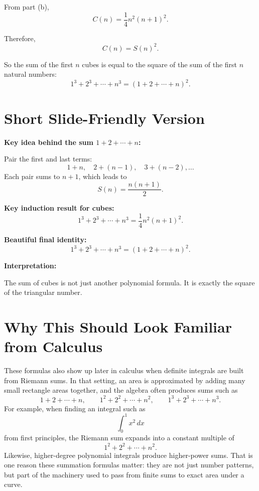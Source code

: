 \documentclass[12pt]{article}
\begin{document}
From part (b),
\[
C(n)=\frac{1}{4}n^2(n+1)^2.
\]

Therefore,
\[
C(n)=S(n)^2.
\]

So the sum of the first \(n\) cubes is equal to the square of the sum of the first \(n\) natural numbers:
\[
1^3+2^3+\cdots+n^3 = \left(1+2+\cdots+n\right)^2.
\]

\vspace{6cm}

\newpage

\section*{Short Slide-Friendly Version}

\textbf{Key idea behind the sum \(1+2+\cdots+n\):}

Pair the first and last terms:
\[
1+n,\quad 2+(n-1),\quad 3+(n-2),\dots
\]
Each pair sums to \(n+1\), which leads to
\[
S(n)=\frac{n(n+1)}{2}.
\]

\vspace{3cm}

\textbf{Key induction result for cubes:}
\[
1^3+2^3+\cdots+n^3=\frac{1}{4}n^2(n+1)^2.
\]

\vspace{3cm}

\textbf{Beautiful final identity:}
\[
1^3+2^3+\cdots+n^3
=
\left(1+2+\cdots+n\right)^2.
\]

\vspace{3cm}

\textbf{Interpretation:}

The sum of cubes is not just another polynomial formula. It is exactly the square of the triangular number.

\vfill

\section*{Why This Should Look Familiar from Calculus}

These formulas also show up later in calculus when definite integrals are built from Riemann sums. In that setting, an area is approximated by adding many small rectangle areas together, and the algebra often produces sums such as
\[
1+2+\cdots+n,\qquad 1^2+2^2+\cdots+n^2,\qquad 1^3+2^3+\cdots+n^3.
\]
For example, when finding an integral such as
\[
\int_0^1 x^2\,dx
\]
from first principles, the Riemann sum expands into a constant multiple of
\[
1^2+2^2+\cdots+n^2.
\]
Likewise, higher-degree polynomial integrals produce higher-power sums. That is one reason these summation formulas matter: they are not just number patterns, but part of the machinery used to pass from finite sums to exact area under a curve.
\end{document}

